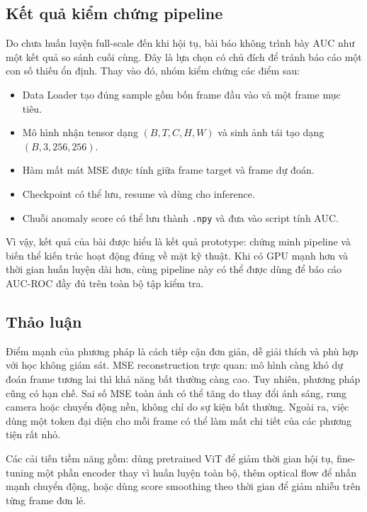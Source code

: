 \subsection{Kết quả kiểm chứng pipeline}

Do chưa huấn luyện full-scale đến khi hội tụ, bài báo không trình bày AUC như một kết quả so sánh cuối cùng. Đây là lựa chọn có chủ đích để tránh báo cáo một con số thiếu ổn định. Thay vào đó, nhóm kiểm chứng các điểm sau:
\begin{itemize}
    \item Data Loader tạo đúng sample gồm bốn frame đầu vào và một frame mục tiêu.
    \item Mô hình nhận tensor dạng $(B,T,C,H,W)$ và sinh ảnh tái tạo dạng $(B,3,256,256)$.
    \item Hàm mất mát MSE được tính giữa frame target và frame dự đoán.
    \item Checkpoint có thể lưu, resume và dùng cho inference.
    \item Chuỗi anomaly score có thể lưu thành \texttt{.npy} và đưa vào script tính AUC.
\end{itemize}

Vì vậy, kết quả của bài được hiểu là kết quả prototype: chứng minh pipeline và biến thể kiến trúc hoạt động đúng về mặt kỹ thuật. Khi có GPU mạnh hơn và thời gian huấn luyện dài hơn, cùng pipeline này có thể được dùng để báo cáo AUC-ROC đầy đủ trên toàn bộ tập kiểm tra.

\subsection{Thảo luận}

Điểm mạnh của phương pháp là cách tiếp cận đơn giản, dễ giải thích và phù hợp với học không giám sát. MSE reconstruction trực quan: mô hình càng khó dự đoán frame tương lai thì khả năng bất thường càng cao. Tuy nhiên, phương pháp cũng có hạn chế. Sai số MSE toàn ảnh có thể tăng do thay đổi ánh sáng, rung camera hoặc chuyển động nền, không chỉ do sự kiện bất thường. Ngoài ra, việc dùng một token đại diện cho mỗi frame có thể làm mất chi tiết của các phương tiện rất nhỏ.

Các cải tiến tiềm năng gồm: dùng pretrained ViT để giảm thời gian hội tụ, fine-tuning một phần encoder thay vì huấn luyện toàn bộ, thêm optical flow để nhấn mạnh chuyển động, hoặc dùng score smoothing theo thời gian để giảm nhiễu trên từng frame đơn lẻ.
